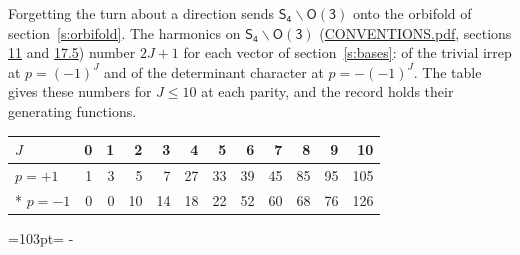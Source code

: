 \documentclass[10pt,a4paper]{article}
\newcommand{\needspace}[1]{\par\penalty-100\begingroup\dimen0=#1\relax\dimen2=\pagegoal
  \advance\dimen2-\pagetotal\ifdim\dimen0>\dimen2\relax\ifdim\dimen2>0pt\vfil\break\fi\fi
  \endgroup}
\numberwithin{equation}{section}
\newcommand{\grp}[1]{\mathsf{#1}}
\begin{document}
Forgetting the turn about a direction sends $\grp{S_{4}}\backslash\grp{O(3)}$ onto the orbifold of section~\ref{s:orbifold}.
The harmonics on $\grp{S_{4}}\backslash\grp{O(3)}$ (\href{../../CONVENTIONS.pdf}{CONVENTIONS.pdf}, sections \href{../../CONVENTIONS.pdf\#conv.11}{11} and \href{../../CONVENTIONS.pdf\#conv.17.5}{17.5}) number $2J + 1$ for each vector of section~\ref{s:bases}: of the trivial irrep at $p = (-1)^J$ and of the determinant character at $p = -(-1)^J$. The table gives these numbers for $J \le 10$ at each parity, and the record holds their generating functions.
{\small\setlength{\tabcolsep}{4pt}\begin{longtable}{@{}lrrrrrrrrrrr@{}}\toprule
$J$ & 0 & 1 & 2 & 3 & 4 & 5 & 6 & 7 & 8 & 9 & 10\\\midrule\endhead
\bottomrule\endfoot\endlastfoot
$p = +1$ & 1 & 3 & 5 & 7 & 27 & 33 & 39 & 45 & 85 & 95 & 105\\*
$p = -1$ & 0 & 0 & 10 & 14 & 18 & 22 & 52 & 60 & 68 & 76 & 126\\
\bottomrule\end{longtable}}
\needspace{103pt}
\end{document}

